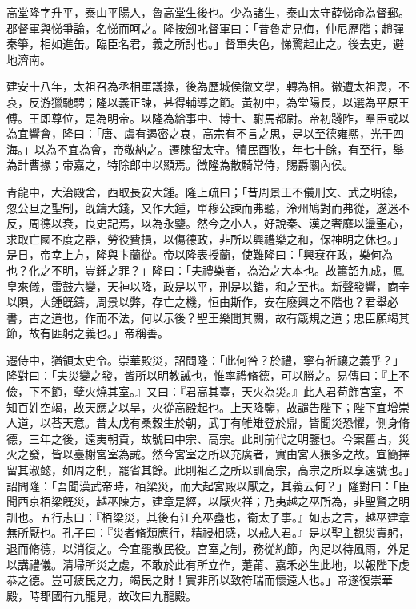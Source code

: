 \begin{pinyinscope}
 
 
 高堂隆字升平，泰山平陽人，魯高堂生後也。少為諸生，泰山太守薛悌命為督郵。郡督軍與悌爭論，名悌而呵之。隆按劒叱督軍曰：「昔魯定見侮，仲尼歷階；趙彈秦箏，相如進缶。臨臣名君，義之所討也。」督軍失色，悌驚起止之。後去吏，避地濟南。
 
 
 
 
 建安十八年，太祖召為丞相軍議掾，後為歷城侯徽文學，轉為相。徽遭太祖喪，不哀，反游獵馳騁；隆以義正諫，甚得輔導之節。黃初中，為堂陽長，以選為平原王傅。王即尊位，是為明帝。以隆為給事中、博士、駙馬都尉。帝初踐阼，羣臣或以為宜響會，隆曰：「唐、虞有遏密之哀，高宗有不言之思，是以至德雍熈，光于四海。」以為不宜為會，帝敬納之。遷陳留太守。犢民酉牧，年七十餘，有至行，舉為計曹掾；帝嘉之，特除郎中以顯焉。徵隆為散騎常侍，賜爵關內侯。
 
 
 
 
 
 
 青龍中，大治殿舍，西取長安大鍾。隆上疏曰；「昔周景王不儀刑文、武之明德，忽公旦之聖制，旣鑄大錢，又作大鍾，單穆公諫而弗聽，泠州鳩對而弗從，遂迷不反，周德以衰，良史記焉，以為永鑒。然今之小人，好說秦、漢之奢靡以盪聖心，求取亡國不度之器，勞役費損，以傷德政，非所以興禮樂之和，保神明之休也。」是日，帝幸上方，隆與卞蘭從。帝以隆表授蘭，使難隆曰：「興衰在政，樂何為也？化之不明，豈鍾之罪？」隆曰：「夫禮樂者，為治之大本也。故簫韶九成，鳳皇來儀，雷鼓六變，天神以降，政是以平，刑是以錯，和之至也。新聲發響，商辛以隕，大鍾旣鑄，周景以弊，存亡之機，恒由斯作，安在廢興之不階也？君舉必書，古之道也，作而不法，何以示後？聖王樂聞其闕，故有箴規之道；忠臣願竭其節，故有匪躬之義也。」帝稱善。
 
 
 
 
 遷侍中，猶領太史令。崇華殿災，詔問隆：「此何咎？於禮，寧有祈禳之義乎？」隆對曰：「夫災變之發，皆所以明教誡也，惟率禮脩德，可以勝之。易傳曰：『上不儉，下不節，孽火燒其室。』又曰：『君高其臺，天火為災。』此人君苟飾宮室，不知百姓空竭，故天應之以旱，火從高殿起也。上天降鑒，故譴告陛下；陛下宜增崇人道，以荅天意。昔太戊有桑穀生於朝，武丁有雊雉登於鼎，皆聞災恐懼，側身脩德，三年之後，遠夷朝貢，故號曰中宗、高宗。此則前代之明鑒也。今案舊占，災火之發，皆以臺榭宮室為誡。然今宮室之所以充廣者，實由宮人猥多之故。宜簡擇留其淑懿，如周之制，罷省其餘。此則祖乙之所以訓高宗，高宗之所以享遠號也。」詔問隆：「吾聞漢武帝時，栢梁災，而大起宮殿以厭之，其義云何？」隆對曰：「臣聞西京栢梁旣災，越巫陳方，建章是經，以厭火祥；乃夷越之巫所為，非聖賢之明訓也。五行志曰：『栢梁災，其後有江充巫蠱也，衞太子事。』如志之言，越巫建章無所厭也。孔子曰：『災者脩類應行，精祲相感，以戒人君。』是以聖主覩災責躬，退而脩德，以消復之。今宜罷散民役。宮室之制，務從約節，內足以待風雨，外足以講禮儀。清埽所災之處，不敢於此有所立作，萐莆、嘉禾必生此地，以報陛下虔恭之德。豈可疲民之力，竭民之財！實非所以致符瑞而懷遠人也。」帝遂復崇華殿，時郡國有九龍見，故改曰九龍殿。
 

\end{pinyinscope}
